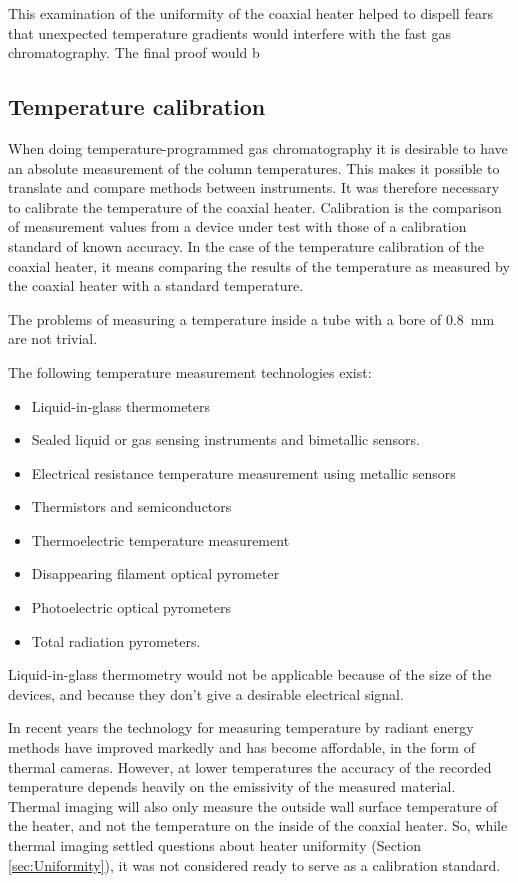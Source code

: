 This examination of the uniformity of the coaxial heater helped to dispell fears
that unexpected temperature gradients would interfere with the fast gas
chromatography. The final proof would b

\subsection{Temperature calibration}

When doing temperature-programmed gas chromatography it is desirable to have an
absolute measurement of the column temperatures. This makes it possible to
translate and compare methods between instruments. It was therefore necessary to
calibrate the temperature of the coaxial heater. Calibration is the comparison
of measurement values from a device under test with those of a calibration
standard of known accuracy. In the case of the temperature calibration of the
coaxial heater, it means comparing the results of the temperature as measured by
the coaxial heater with a standard temperature.

The problems of measuring a temperature inside a tube with a bore of
\SI{0.8}{\milli\metre} are not trivial.

The following temperature measurement technologies exist:
\begin{itemize}
	\item Liquid-in-glass thermometers
	\item Sealed liquid or gas sensing instruments and bimetallic sensors.
	\item Electrical resistance temperature measurement using metallic sensors
	\item Thermistors and semiconductors
	\item Thermoelectric temperature measurement
	\item Disappearing filament optical pyrometer
	\item Photoelectric optical pyrometers
	\item Total radiation pyrometers.
\end{itemize}

Liquid-in-glass thermometry would not be applicable because of the size of the
devices, and because they don't give a desirable electrical signal. 

In recent years the technology for measuring temperature by radiant energy
methods have improved markedly and has become affordable, in the form of thermal
cameras. However, at lower temperatures the accuracy of the recorded temperature
depends heavily on the emissivity of the measured material. Thermal imaging will
also only measure the outside wall surface temperature of the heater, and not
the temperature on the inside of the coaxial heater. So, while thermal imaging
settled questions about heater uniformity (Section \ref{sec:Uniformity}), it was
not considered ready to serve as a calibration standard. 

